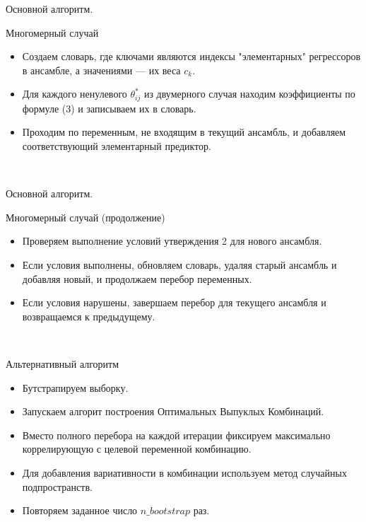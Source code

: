 \documentclass{beamer}
\begin{document}
\begin{frame}{Основной алгоритм.}
\begin{block}{Многомерный случай}
 \begin{itemize}
    \item Создаем словарь, где ключами являются индексы "элементарных" регрессоров в ансамбле, а значениями — их веса $c_k$.
    \item Для каждого ненулевого $\theta^*_{ij}$ из двумерного случая находим коэффициенты по формуле (3) и записываем их в словарь.
    \item Проходим по переменным, не входящим в текущий ансамбль, и добавляем соответствующий элементарный предиктор.
\end{itemize} \\
\end{block}
\end{frame}
\begin{frame}{Основной алгоритм.}
\begin{block}{Многомерный случай (продолжение)}
 \begin{itemize}
    \item Проверяем выполнение условий утверждения 2 для нового ансамбля.
    \item Если условия выполнены, обновляем словарь, удаляя старый ансамбль и добавляя новый, и продолжаем перебор переменных.
    \item Если условия нарушены, завершаем перебор для текущего ансамбля и возвращаемся к предыдущему. 
\end{itemize} \\
\end{block}
\end{frame}
\begin{frame}{Альтернативный алгоритм}
 \begin{itemize}
    \item Бутстрапируем выборку.
    \item Запускаем алгорит построения Оптимальных Выпуклых Комбинаций.
    \item Вместо полного перебора на каждой итерации фиксируем максимально коррелирующую с целевой переменной комбинацию.
    \item Для добавления вариативности в комбинации используем метод случайных подпространств.
    \item Повторяем заданное число $n\_bootstrap$ раз.
\end{itemize}
\end{frame}
\end{document}
